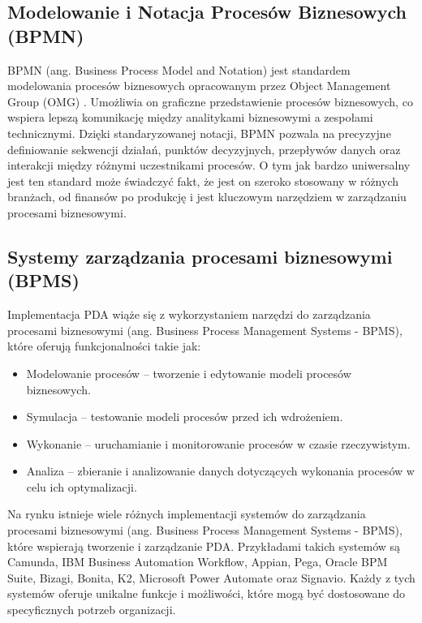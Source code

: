 \subsection{Modelowanie i Notacja Procesów 
\label{subsec:bpmn}
Biznesowych (BPMN)}
BPMN (ang. Business Process Model and Notation) jest standardem modelowania procesów biznesowych opracowanym przez Object Management Group (OMG) \cite{omg_bpmn}. Umożliwia on graficzne przedstawienie procesów biznesowych, co wspiera lepszą komunikację między analitykami biznesowymi a zespołami technicznymi. Dzięki standaryzowanej notacji, BPMN pozwala na precyzyjne definiowanie sekwencji działań, punktów decyzyjnych, przepływów danych oraz interakcji między różnymi uczestnikami procesów\cite{white_bpmn}. O tym jak bardzo uniwersalny jest ten standard może świadczyć fakt, że jest on szeroko stosowany w różnych branżach, od finansów\cite{finance_bpmn} po produkcję\cite{production_bpmn} i jest kluczowym narzędziem w zarządzaniu procesami biznesowymi\cite{dumas_bpmn}.

\subsection{Systemy zarządzania procesami biznesowymi 
\label{subec:bpms}
(BPMS)}
Implementacja PDA wiąże się z wykorzystaniem narzędzi do zarządzania procesami biznesowymi (ang. Business Process Management Systems - BPMS)\cite{techtarget_bpms}, które oferują funkcjonalności takie jak:
\begin{itemize}
\item Modelowanie procesów – tworzenie i edytowanie modeli procesów biznesowych.
\item Symulacja – testowanie modeli procesów przed ich wdrożeniem.
\item Wykonanie – uruchamianie i monitorowanie procesów w czasie rzeczywistym.
\item Analiza – zbieranie i analizowanie danych dotyczących wykonania procesów w celu ich optymalizacji.
\end{itemize}
Na rynku istnieje wiele różnych implementacji systemów do zarządzania procesami biznesowymi (ang. Business Process Management Systems - BPMS), które wspierają tworzenie i zarządzanie PDA. Przykładami takich systemów są Camunda\cite{camunda}, IBM Business Automation Workflow\cite{ibm_baw}, Appian\cite{appian}, Pega\cite{pega}, Oracle BPM Suite\cite{oracle_bpm}, Bizagi\cite{bizagi}, Bonita\cite{bonitasoft}, K2\cite{k2}, Microsoft Power Automate\cite{microsoft_power_automate} oraz Signavio\cite{signavio}. Każdy z tych systemów oferuje unikalne funkcje i możliwości, które mogą być dostosowane do specyficznych potrzeb organizacji.

